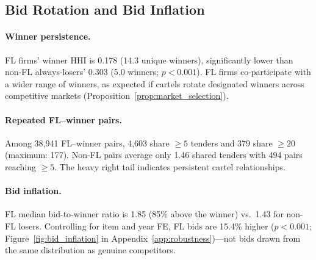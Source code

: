 
\subsection{Bid Rotation and Bid Inflation}
\label{sec:bid_rotation}

\paragraph{Winner persistence.}
FL firms' winner HHI is 0.178 (14.3 unique winners), significantly
lower than non-FL always-losers' 0.303 (5.0 winners; $p < 0.001$).
FL firms co-participate with a wider range of winners, as expected
if cartels rotate designated winners across competitive markets
(Proposition~\ref{prop:market_selection}).

\paragraph{Repeated FL--winner pairs.}
Among 38,941 FL--winner pairs, 4,603 share $\geq 5$ tenders and
379 share $\geq 20$ (maximum: 177). Non-FL pairs average only
1.46 shared tenders with 494 pairs reaching $\geq 5$. The heavy
right tail indicates persistent cartel relationships.

\paragraph{Bid inflation.}
FL median bid-to-winner ratio is 1.85 (85\% above the winner) vs.\
1.43 for non-FL losers. Controlling for item and year FE, FL bids
are 15.4\% higher ($p < 0.001$;
Figure~\ref{fig:bid_inflation} in Appendix~\ref{app:robustness})---not
bids drawn from the same distribution as genuine competitors.
